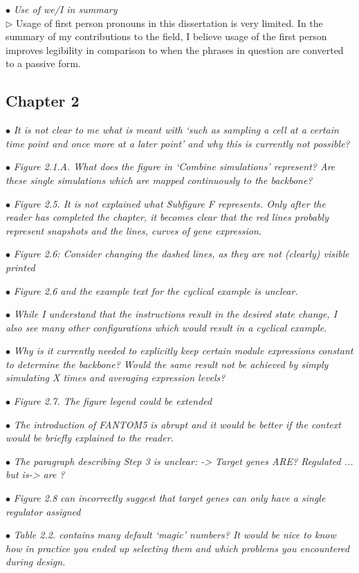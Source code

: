 \documentclass[10pt]{article}
\newcommand{\exam}[2][\  ]{\hspace{0pt}\marginpar{\color{red}#1}$\bullet$ \textit{#2}}
\newcommand{\imp}[1]{{\color{red} #1}}
\newcommand{\answ}[1]{{\color{blue} $\triangleright$ #1}}
\newcommand{\bigexclaim}{\raisebox{-0.1em}{\BigTriangleUp}\hspace{-0.32em}\llap{\small\textbf{!}}\hspace{0.32em}}
\newcommand{\tagimp}{\bigexclaim}
\newcommand{\tagtime}{{\Large $\hourglass$}}
\begin{document}
{{\exam{Use of we/I in summary} \\
\answ{Usage of first person pronouns in this dissertation is very limited. In the summary of my contributions to the field, I believe usage of the first person improves legibility in comparison to when the phrases in question are converted to a passive form.}



\subsection{Chapter 2}

\exam{It is not clear to me what is meant with ‘such as sampling a cell at a certain
	time point and once more at a later point’ and why this is currently not
	possible?}

\exam{Figure 2.1.A. What does the figure in ‘Combine simulations’ represent? Are
		these single simulations which are mapped continuously to the backbone?}

\exam{Figure 2.5. It is not explained what Subfigure F represents. Only after the
	reader has completed the chapter, it becomes clear that the red lines probably
	represent snapshots and the lines, curves of gene expression.}

\exam{Figure 2.6: Consider changing the dashed lines, as they are not (clearly)
		visible printed}
	
\exam{Figure 2.6 and the example text for the cyclical example is unclear.}

\exam{While I
		understand that the instructions result in the desired state change, I also see
		many other configurations which would result in a cyclical example.}
	
\exam{Why is it currently needed to explicitly keep certain module expressions constant to
		determine the backbone? Would the same result not be achieved by simply
		simulating X times and averaging expression levels?}

\exam{Figure 2.7. The figure legend could be extended}

\exam{The introduction of FANTOM5 is abrupt and it would be better if the context
		would be briefly explained to the reader.}
	
\exam{The paragraph describing Step 3 is unclear: -> Target genes ARE? Regulated
		... but is-> are ?}

\exam{Figure 2.8 can incorrectly suggest that target genes can only have a single
		regulator assigned}


\exam[\tagimp \tagtime]{\imp{Table 2.2. contains many default ‘magic’ numbers?} It would be nice to know
		how in practice you ended up selecting them and which problems you
		encountered during design.}


}}
\end{document}
